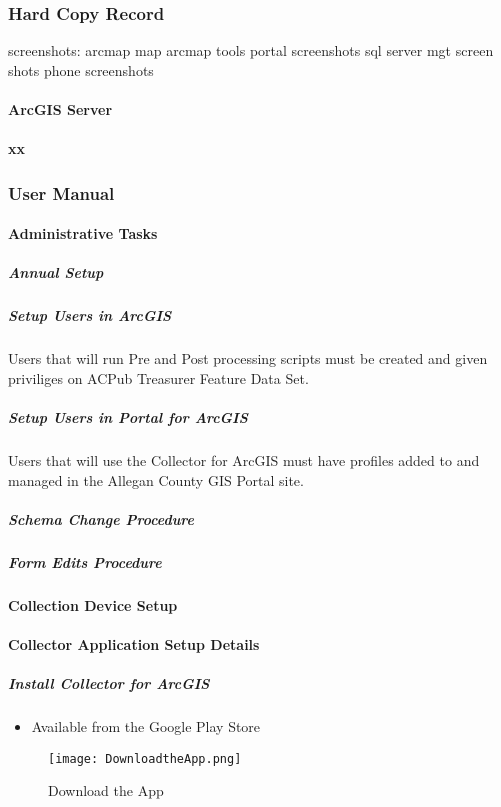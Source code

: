 \documentclass[class=article , crop=false, titlepage, twoside, multi={itemize, figure, verbatim}, float=false]{standalone}
\begin{document}
\clearpage
\subsubsection{Hard Copy Record}
screenshots:
arcmap map 
arcmap tools
portal screenshots
sql server mgt screen shots
phone screenshots

\paragraph{ArcGIS Server}

\paragraph{xx}


\clearpage
\subsubsection{User Manual}

\paragraph{Administrative Tasks}

\subparagraph{Annual Setup}

\subparagraph{Setup Users in ArcGIS}Users that will run Pre and Post processing scripts must be created and given priviliges on ACPub Treasurer Feature Data Set.

\subparagraph{Setup Users in Portal for ArcGIS}Users that will use the Collector for ArcGIS must have profiles added to and managed in the Allegan County GIS Portal site.

\subparagraph{Schema Change Procedure}

\subparagraph{Form Edits Procedure}

\clearpage
\paragraph{Collection Device Setup}

\paragraph{Collector Application Setup Details}

\subparagraph{Install Collector for ArcGIS}
\begin{itemize}
\item Available from the Google Play Store
\end{itemize}
\begin{figure}[h!]
\centering
    \texttt{[image: DownloadtheApp.png]}
\caption{Download the App}
\end{figure}
\end{document}
